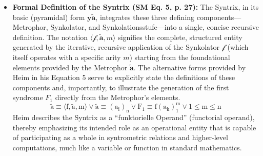 \documentclass[12pt]{article}
\newcommand{\q}[1]{\enquote{#1}}
\newcommand{\syntrix}{\bm{y\widetilde{a}}}
\newcommand{\metrophor}{\bm{\widetilde{a}}}
\newcommand{\synkolator}{\mathcal{f}}
\newcommand{\synkolationsstufe}{m}
\newcommand{\syndrom}{F}
\begin{document}
\begin{itemize}
    \item \textbf{Formal Definition of the Syntrix (SM Eq. 5, p. 27):}
    The Syntrix, in its basic (pyramidal) form \( \syntrix \), integrates these three defining components—Metrophor, Synkolator, and Synkolationsstufe—into a single, concise recursive definition. The notation \( \langle \synkolator, \metrophor, \synkolationsstufe \rangle \) signifies the complete, structured entity generated by the iterative, recursive application of the Synkolator \( \synkolator \) (which itself operates with a specific arity \( \synkolationsstufe \)) starting from the foundational elements provided by the Metrophor \( \metrophor \). The alternative forms provided by Heim in his Equation 5 serve to explicitly state the definitions of these components and, importantly, to illustrate the generation of the first syndrome \( \syndrom_1 \) directly from the Metrophor's elements.
        \begin{equation}
        \tilde{\mathrm{a}} \equiv \langle \mathrm{f}, \tilde{\mathrm{a}}, \mathrm{m} \rangle \lor \tilde{\mathrm{a}} \equiv (\mathrm{a}_{\mathrm{i}})_{\mathrm{n}} \lor \mathrm{F}_1 \equiv \mathrm{f}(\mathrm{a}_{\mathrm{k}})_1^{\mathrm{m}} \lor 1 \le \mathrm{m} \le \mathrm{n} \tag{5}
        \label{eq:original_syntrix_definition}
        \end{equation}
    Heim describes the Syntrix as a \q{funktorielle Operand} (functorial operand), thereby emphasizing its intended role as an operational entity that is capable of participating as a whole in syntrometric relations and higher-level computations, much like a variable or function in standard mathematics.


\end{itemize}
\end{document}
